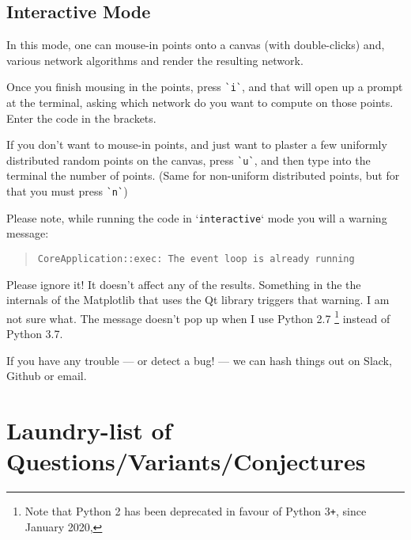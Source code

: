 \begin{appendices}
\subsection{Interactive Mode}

In this mode, one can mouse-in points onto a canvas (with double-clicks) and, various network algorithms and render the 
resulting network. 

Once you finish mousing in the points, press \verb|`i`|, and that will open up a prompt at the terminal, asking which 
network do you want to compute on those points. Enter the code in the brackets. 

If you don't want to mouse-in points, and just want to plaster a few uniformly distributed random points on the canvas, 
press \verb|`u`|, and then type into the terminal the number of points. (Same for non-uniform distributed points, but for that
you must press \verb|`n`|)

Please note, while  running the  code in `\verb|interactive|` mode you will a
warning message:

\begin{quote}
\color{blue}
\verb|CoreApplication::exec: The event loop is already running|
\end{quote}

Please ignore it! It doesn't affect any of the results. Something in the
the internals of the Matplotlib that uses the Qt library triggers that warning. I 
am not sure what. The message doesn't pop up
when I use Python 2.7 \footnote{Note that Python 2 has been deprecated in favour of Python 3\texttt{+}, since January 2020, } 
instead of Python 3.7. 

If you have any trouble --- or detect a bug! ---  we can hash things out on Slack, Github or email.

\section{Laundry-list of Questions/Variants/Conjectures}
\end{appendices}
